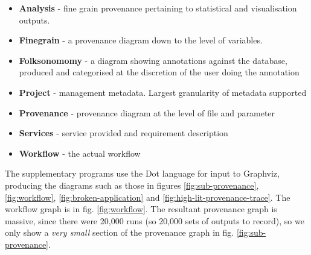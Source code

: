 \documentclass[runningheads]{llncs}
\begin{document}
\begin{itemize} \item \textbf{Analysis} - fine grain provenance pertaining to
            statistical and visualisation outputs.

        \item \textbf{Finegrain} - a provenance diagram down to the level of
        variables.  \item \textbf{Folksonomomy} - a diagram showing annotations
            against the database, produced and categorised at the discretion of
            the user doing the annotation \item \textbf{Project} - management
            metadata. Largest granularity of metadata supported \item
            \textbf{Provenance} - provenance diagram at the level of file and
        parameter \item \textbf{Services} - service provided and requirement
            description \item \textbf{Workflow} - the actual workflow
\end{itemize}

The supplementary programs use the Dot language for input to Graphviz\cite{ellson2002graphviz}, producing the diagrams such as those in figures
\ref{fig:sub-provenance}, \ref{fig:workflow}, \ref{fig:broken-application} and
\ref{fig:high-lit-provenance-trace}. The workflow graph is in
fig. \ref{fig:workflow}. The resultant provenance graph is massive, since there were 20,000 runs (so 20,000 sets of outputs to record), so we only show a \textit{very small} section of the provenance graph in fig.
\ref{fig:sub-provenance}. 
\end{document}
